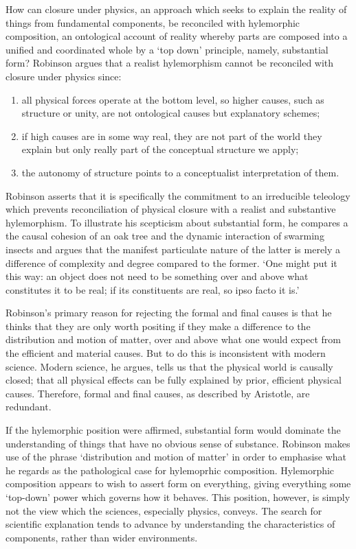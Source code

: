 How can closure under physics, an approach which seeks to explain the reality of things from fundamental components, be reconciled with hylemorphic composition, an ontological account of reality whereby parts are composed into a unified and coordinated whole by a `top down' principle, namely, substantial form? Robinson argues that a realist hylemorphism cannot be reconciled with closure under physics since:
\begin{enumerate}
\item all physical forces operate at the bottom level, so higher causes, such as structure or unity, are not ontological causes but explanatory schemes;
\item if high causes are in some way real, they are not part of the world they explain but only really part of the conceptual structure we apply;
\item the autonomy of structure points to a conceptualist interpretation of them.
\end{enumerate}
Robinson asserts that it is specifically the commitment to an irreducible teleology which prevents reconciliation of physical closure with a realist and substantive hylemorphism. To illustrate his scepticism about substantial form, he compares a the causal cohesion of an oak tree and the dynamic interaction of swarming insects and argues that the manifest particulate nature of the latter is merely a difference of complexity and degree compared to the former. `One might put it this way: an object does not need to be something over and above what constitutes it to be real; if its constituents are real, so ipso facto it is.' \parencite[][208]{Robinson2014-ROBMHA-3}

Robinson's primary reason for rejecting the formal and final causes is that he thinks that they are only worth positing if they make a difference to the distribution and motion of matter, over and above what one would expect from the efficient and material causes. But to do this is inconsistent with modern science.
Modern science, he argues, tells us that the physical world is causally closed; that all physical effects can be fully explained by prior, efficient physical causes. Therefore, formal and final causes, as described by Aristotle, are redundant.

If the hylemorphic position were affirmed, substantial form would dominate the understanding of things that have no obvious sense of substance. Robinson makes use of the phrase `distribution and motion of matter' in order to emphasise what he regards as the pathological case for hylemoprhic composition. Hylemorphic composition appears to wish to assert form on everything, giving everything some `top-down' power which governs how it behaves. This position, however, is simply not the view which the sciences, especially physics, conveys. The search for scientific explanation tends to advance by understanding the characteristics of components, rather than wider environments.

